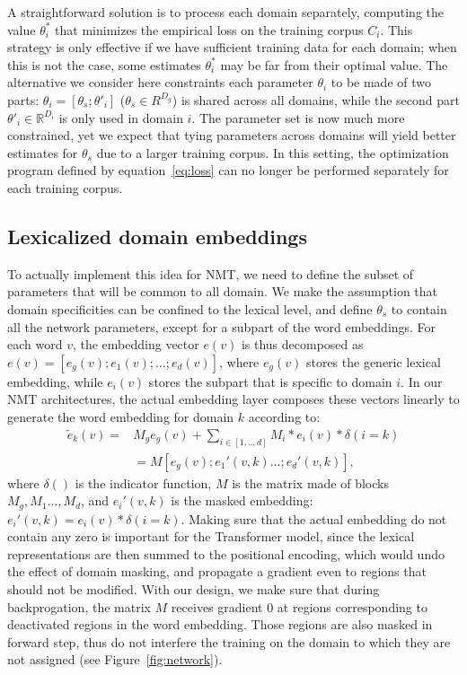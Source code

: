 \documentclass[11pt,a4paper]{article}
\newcommand{\fyDone}[1]{\done[FY]\Todo[FY:]{\textcolor{orange}{#1}}}
\begin{document}
A straightforward solution is to process each domain separately, computing the value $\theta_i^*$ that minimizes the empirical loss on the training corpus $C_i$. This strategy is only effective if we have sufficient training data for each domain; when this is not the case, some estimates $\theta_i^*$ may be far from their optimal value. \fyDone{Risk}
The alternative we consider here constraints each parameter $\theta_i$ to be made of two parts: $\theta_i = [\theta_s; \theta'_i]$ ($\theta_s \in R^{D_g}$) is shared across all domains, while the second part $\theta'_i \in \mathbb{R}^{D_i}$ is only used in domain $i$.
The parameter set is now much more constrained, yet we expect that tying parameters across domains will yield better estimates for $\theta_s$ due to a larger training corpus. In this setting, the optimization program defined by equation~\eqref{eq:loss} can no longer be performed separately for each training corpus.

\subsection{Lexicalized domain embeddings \label{ssec:lde}}

To actually implement this idea for NMT, we need to define the subset of parameters that will be common to all domain. We make the assumption that domain specificities can be confined to the lexical level, and define $\theta_s$ to contain all the network parameters, except for a subpart of the word embeddings. For each word $v$, the embedding vector $e(v)$ is thus decomposed as $e(v) = [e_g(v); e_1(v); \dots; e_d(v)]$, where $e_g(v)$ stores the generic lexical embedding, while $e_i(v)$ stores the subpart that is specific to domain $i$.
In our NMT architectures, the actual embedding layer composes these vectors linearly to generate the word embedding for domain $k$ according to:
\begin{align}
  \tilde{e}_k(v) =& M_g e_g(v) + \sum_{i \in [1,..,d]} M_i * e_i(v) * \delta(i=k) \nonumber \\
   & = M [e_g(v); e_1'(v,k) \dots; e_d'(v,k)], \label{eq:embedding}
\end{align}
where $\delta()$ is the indicator function, $M$ is the matrix made of blocks $M_g, M_1 \dots, M_d$, and $e_i'(v,k)$ is the masked embedding: $e_i'(v,k)= e_i(v) * \delta(i=k)$.  Making sure that the actual embedding do not contain any zero is important for the Transformer model, since the lexical representations are then summed to the positional encoding, which would undo the effect of domain masking, and propagate a gradient even to regions that should not be modified. With our design, we make sure that during backprogation, the matrix $M$ receives gradient $0$ at regions corresponding to deactivated regions in the word embedding. Those regions are also masked in forward step, thus do not interfere the training on the domain to which they are not assigned (see Figure~\ref{fig:network}).
\end{document}
